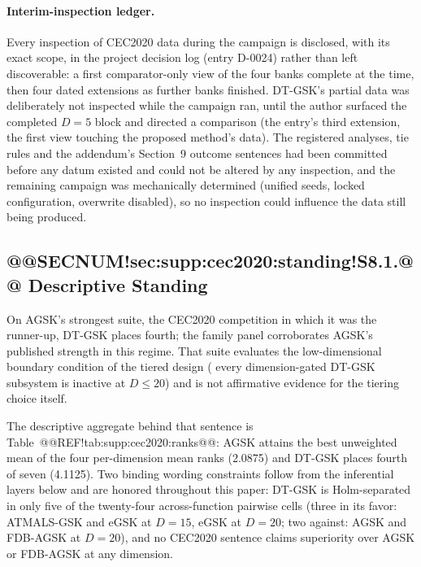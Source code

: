 \documentclass[10pt,a4paper]{article}
\newcommand{\dtgsk}{DT-GSK}
\newcommand{\atmals}{ATMALS-GSK}
\newcommand{\agsk}{AGSK}
\newcommand{\fdbagsk}{FDB-AGSK}
\newcommand{\egsk}{eGSK}
\begin{document}
\paragraph{Interim-inspection ledger.}
Every inspection of CEC2020 data during the campaign is disclosed, with
its exact scope, in the project decision log (entry D-0024) rather than
left discoverable: a first comparator-only view of the four banks complete
at the time, then four dated extensions as further banks finished.
\dtgsk{}'s partial data was deliberately not inspected while the campaign
ran, until the author surfaced the completed $D = 5$ block and directed a
comparison (the entry's third extension, the first view touching the
proposed method's data).  The registered analyses, tie rules and the
addendum's Section~9 outcome sentences had been committed before any datum existed
and could not be altered by any inspection, and the remaining campaign was
mechanically determined (unified seeds, locked configuration, overwrite
disabled), so no inspection could influence the data still being
produced.


\subsection{@@SECNUM!sec:supp:cec2020:standing!S8.1.@@ Descriptive Standing}\label{sec:supp:cec2020:standing}

On AGSK's strongest suite, the CEC2020 competition in which it was
the runner-up, \dtgsk{} places fourth; the family
panel corroborates AGSK's published strength in this regime.  That suite
evaluates the low-dimensional boundary condition of the tiered design (
every dimension-gated \dtgsk{} subsystem is inactive at $D \le 20$)
and is not affirmative evidence for the tiering choice itself.





The descriptive aggregate behind that sentence is
Table~@@REF!tab:supp:cec2020:ranks@@: \agsk{} attains the best unweighted
mean of the four per-dimension mean ranks (2.0875) and \dtgsk{} places
fourth of seven (4.1125).  Two binding wording constraints follow from the
inferential layers below and are honored throughout this paper: \dtgsk{}
is Holm-separated in only five of the twenty-four across-function pairwise
cells (three in its favor: \atmals{} and \egsk{} at $D = 15$,
\egsk{} at $D = 20$; two against: \agsk{} and \fdbagsk{} at
$D = 20$), and no CEC2020 sentence claims superiority over \agsk{} or
\fdbagsk{} at any dimension.
\end{document}
